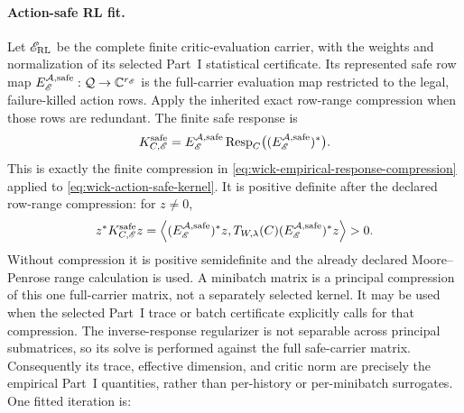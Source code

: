 \documentclass[11pt]{article}
\numberwithin{section}{part}
\theoremstyle{plain}
\theoremstyle{definition}
\theoremstyle{remark}
\begin{document}
\paragraph{Action-safe RL fit.}
Let \(\mathscr E_{\rm RL}\) be the complete finite critic-evaluation carrier,
with the weights and normalization of its selected Part~I statistical
certificate.  Its represented safe row map
\(E_{\mathscr E}^{\mathcal A,{\rm safe}}:\mathcal Q\to
\mathbb C^{r_{\mathscr E}}\) is the full-carrier evaluation map restricted
to the legal, failure-killed action rows.  Apply the inherited exact row-range
compression when those rows are redundant.  The finite safe response is
\begin{equation}
 \label{eq:wick-empirical-safe-response}
 K_{C,\mathscr E}^{\rm safe}
 =E_{\mathscr E}^{\mathcal A,{\rm safe}}
   \operatorname{Resp}_C
   \bigl((E_{\mathscr E}^{\mathcal A,{\rm safe}})^*\bigr).
\end{equation}
This is exactly the finite compression in
\eqref{eq:wick-empirical-response-compression} applied to
\eqref{eq:wick-action-safe-kernel}.  It is positive definite after the
declared row-range compression: for \(z\ne0\),
\[
 z^*K_{C,\mathscr E}^{\rm safe}z
 =\left\langle
 (E_{\mathscr E}^{\mathcal A,{\rm safe}})^*z,
 T_{W,\lambda}(C)
 (E_{\mathscr E}^{\mathcal A,{\rm safe}})^*z
 \right\rangle>0.
\]
Without compression it is positive semidefinite and the already declared
Moore--Penrose range calculation is used.  A minibatch matrix is a principal
compression of this one full-carrier matrix, not a separately selected
kernel.  It may be used when the selected Part~I trace or batch certificate
explicitly calls for that compression.  The inverse-response regularizer is
not separable across principal submatrices, so its solve is performed against
the full safe-carrier matrix.  Consequently its trace, effective dimension,
and critic norm are precisely the empirical Part~I quantities, rather than
per-history or per-minibatch surrogates.  One fitted iteration is:
\end{document}
